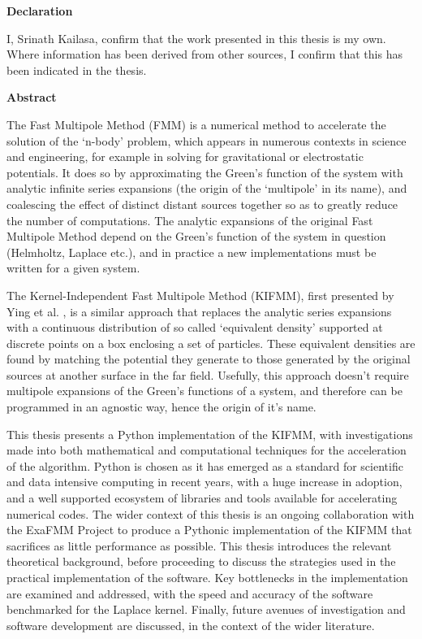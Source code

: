 \thispagestyle{plain}

\begin{center}
    \textbf{Declaration}
\end{center}
I, Srinath Kailasa, confirm that the work presented in this thesis is my own. Where information has been derived from other
sources, I confirm that this has been indicated in the thesis.

\begin{center}
    \textbf{Abstract}
\end{center}

The Fast Multipole Method (\gls{FMM}) is a numerical method to accelerate the solution
of the `n-body' problem, which appears in numerous contexts in science and engineering,
for example in solving for gravitational or electrostatic potentials. It does so by approximating
the Green's function of the
system with analytic infinite series expansions (the origin of the `multipole' in its name),
 and coalescing the effect of distinct distant sources together so as to
greatly reduce the number of computations. The analytic expansions of the
original Fast Multipole Method depend on the Green's function of the system in
question (Helmholtz, Laplace etc.), and in practice a new implementations
must be written for a given system.

The Kernel-Independent Fast Multipole Method (\gls{KIFMM}),
first presented by Ying et al. \cite{Ying:2004:JCP}, is a similar approach that replaces
the analytic series expansions with a continuous distribution of so called
`equivalent density' supported at discrete points on a box enclosing a set of
particles. These equivalent densities are found by matching the potential they
generate to those generated by the original sources at another surface in the
far field. Usefully, this approach doesn't require multipole expansions of the
Green's functions of a system, and therefore can be programmed in an agnostic way,
hence the origin of it's name.

This thesis presents a Python implementation of
the KIFMM, with investigations made into both mathematical and computational
techniques for the acceleration of the algorithm. Python is chosen as it has emerged as a standard
for scientific and data intensive computing in recent years, with a huge increase
in adoption, and a well supported ecosystem of libraries and tools available for
accelerating numerical codes. The wider context of this thesis
is an ongoing collaboration with the ExaFMM Project \cite{exafmm} to produce a Pythonic
implementation of the KIFMM that sacrifices as little performance as possible.
This thesis introduces the relevant theoretical background, before
proceeding to discuss the strategies used in the practical implementation of the
software. Key bottlenecks in the implementation are examined and addressed, with the speed
and accuracy of the software benchmarked for the Laplace kernel. Finally, future
avenues of investigation and software development are discussed, in the context
of the wider literature.
